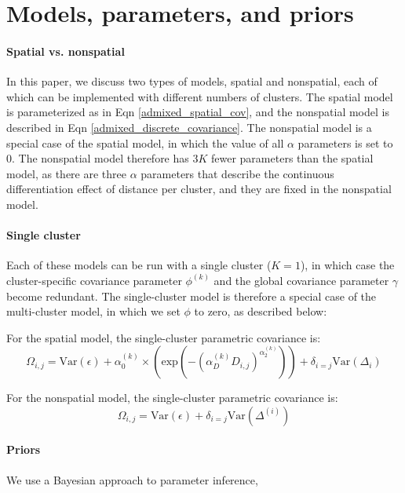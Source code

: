 \documentclass[12pt]{article}
\begin{document}
\section{Models, parameters, and priors}\label{model_app}
\paragraph{Spatial vs. nonspatial}
In this paper, we discuss two types of models, spatial and nonspatial, 
each of which can be implemented with different numbers of clusters.
The spatial model is parameterized as in Eqn \eqref{admixed_spatial_cov},
and the nonspatial model is described in Eqn \eqref{admixed_discrete_covariance}.
The nonspatial model is a special case of the spatial model, 
in which the value of all $\alpha$ parameters is set to 0.
The nonspatial model therefore has $3K$ fewer parameters than the spatial model,
as there are three $\alpha$ parameters that describe the continuous differentiation effect of distance per cluster,
and they are fixed in the nonspatial model.

\paragraph{Single cluster}
Each of these models can be run with a single cluster ($K=1$), 
in which case the cluster-specific covariance parameter $\phi^{(k)}$ 
and the global covariance parameter $\gamma$ become redundant.
The single-cluster model is therefore a special case of the multi-cluster model, 
in which we set $\phi$ to zero, as described below:

For the spatial model, the single-cluster parametric covariance is:
\begin{equation}
\Omega_{i,j} = \text{Var}(\epsilon) + 
\alpha^{(k)}_0 \times \left(\text{exp} \left(  -(\alpha^{(k)}_D D_{i,j})^{\alpha^{(k)}_2}\right) \right)	 +
\delta_{i=j} \text{Var}(\Delta_i)
\label{admixed_continuous_cov}
\end{equation}

For the nonspatial model, the single-cluster parametric covariance is:
\begin{equation}
\Omega_{i,j} = \text{Var}(\epsilon) + \delta_{i=j} \text{Var}(\Delta^{(i)})
\label{admixed_discrete_covariance}
\end{equation}

\paragraph{Priors}
We use a Bayesian approach to parameter inference, 
\end{document}
